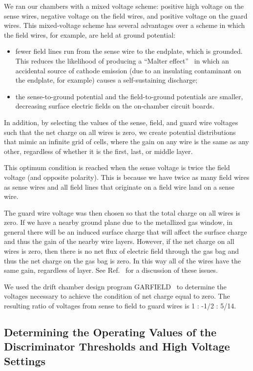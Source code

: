 We ran our chambers with a mixed voltage scheme:
positive high voltage on the sense wires, negative voltage on the
field wires, and positive voltage on the guard wires.
This mixed-voltage scheme has several advantages over a scheme in
which the field wires, for example, are held at ground potential:
\begin{itemize}
\item fewer field lines run from the sense wire to the endplate, which
is grounded.  This reduces the likelihood of producing a ``Malter effect''~\cite{malter} in
which an accidental source of cathode emission
(due to an insulating contaminant on the endplate, for example) causes
a self-sustaining discharge;
\item the sense-to-ground potential and the field-to-ground potentials 
are smaller, decreasing surface electric fields on the on-chamber
circuit boards.
\end{itemize}

In addition, by selecting the values of the sense, field, and
guard wire voltages such that the net charge on all wires is zero, 
we create potential distributions that mimic
an infinite grid of cells, where the gain on any wire is the same as
any other, regardless of whether it is the first, last, or middle layer.

This optimum condition is reached when the sense voltage is twice the
field voltage (and opposite polarity).  This is because we have twice as many
field wires as sense wires and all field lines that originate on a
field wire land on a sense wire.  

The guard wire voltage was then chosen so that the total charge on all wires is zero.  
If we have a nearby ground plane due to the metallized gas window, in general
there will be an induced surface charge that will affect the surface charge and
thus the gain of the nearby wire layers.  However, if the net charge on
all wires is zero, then there is no net flux of electric field through the
gas bag and thus the net charge on the gas bag is zero.  In this way all
of the wires have the same gain, regardless of layer.  
See Ref.~\cite{mdm92} for a discussion of these issues.

We used the drift chamber design program GARFIELD~\cite{GARFIELD} to determine the voltages
necessary to achieve the condition of net charge equal to zero.
The resulting ratio of voltages from sense to field to guard wires is 1 : -1/2 : 5/14.

\subsection{Determining the Operating Values of the Discriminator Thresholds and High Voltage Settings}
\label{determine-operating-parameters}

